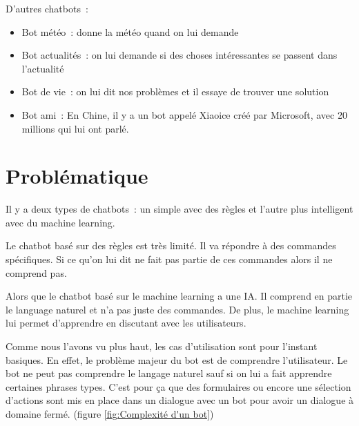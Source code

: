 D’autres chatbots : 
\begin{itemize}
	\item Bot météo : donne la météo quand on lui demande
	\item Bot actualités : on lui demande si des choses intéressantes se passent dans l’actualité
	\item Bot de vie : on lui dit nos problèmes et il essaye de trouver une solution
	\item Bot ami : En Chine, il y a un bot appelé Xiaoice créé par Microsoft, avec 20 millions qui lui ont parlé.
\end{itemize}


\section{Problématique}

	Il y a deux types de chatbots : un simple avec des règles et l’autre plus intelligent avec du machine learning.
	\vspace{1em}	
	
	Le chatbot basé sur des règles est très limité. Il va répondre à des commandes spécifiques. Si ce qu’on lui dit ne fait pas partie de ces commandes alors il ne comprend pas.
	\vspace{1em}	
	
	Alors que le chatbot basé sur le machine learning a une IA. Il comprend en partie le language naturel et n’a pas juste des commandes. De plus, le machine learning lui permet d’apprendre en discutant avec les utilisateurs.
	\vspace{1em}	
	
	Comme nous l’avons vu plus haut, les cas d’utilisation sont pour l’instant basiques. En effet, le problème majeur du bot est de comprendre l’utilisateur. Le bot ne peut pas comprendre le langage naturel sauf si on lui a fait apprendre certaines phrases types. C’est pour ça que des formulaires ou encore une sélection d’actions sont mis en place dans un dialogue avec un bot pour avoir un dialogue à domaine fermé. (figure \ref{fig:Complexité d'un bot})
	\vspace{1em}	
	
